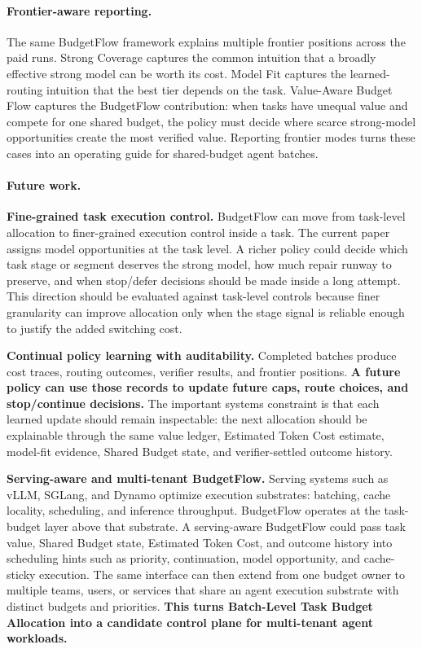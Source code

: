 \documentclass{article}
\newcommand{\method}{BudgetFlow\xspace}
\newcommand{\tokencost}{Estimated Token Cost\xspace}
\newcommand{\sharedbudget}{Shared Budget\xspace}
\begin{document}
\paragraph{Frontier-aware reporting.}
The same \method framework explains multiple frontier positions across the paid runs. Strong Coverage captures the common intuition that a broadly effective strong model can be worth its cost. Model Fit captures the learned-routing intuition that the best tier depends on the task. Value-Aware Budget Flow captures the \method contribution: when tasks have unequal value and compete for one shared budget, the policy must decide where scarce strong-model opportunities create the most verified value. Reporting frontier modes turns these cases into an operating guide for shared-budget agent batches.

\paragraph{Future work.}
\textbf{Fine-grained task execution control.} \method can move from task-level allocation to finer-grained execution control inside a task. The current paper assigns model opportunities at the task level. A richer policy could decide which task stage or segment deserves the strong model, how much repair runway to preserve, and when stop/defer decisions should be made inside a long attempt. This direction should be evaluated against task-level controls because finer granularity can improve allocation only when the stage signal is reliable enough to justify the added switching cost.

\textbf{Continual policy learning with auditability.} Completed batches produce cost traces, routing outcomes, verifier results, and frontier positions. \textbf{A future policy can use those records to update future caps, route choices, and stop/continue decisions.} The important systems constraint is that each learned update should remain inspectable: the next allocation should be explainable through the same value ledger, \tokencost estimate, model-fit evidence, \sharedbudget state, and verifier-settled outcome history.

\textbf{Serving-aware and multi-tenant BudgetFlow.} Serving systems such as vLLM, SGLang, and Dynamo optimize execution substrates: batching, cache locality, scheduling, and inference throughput. \method operates at the task-budget layer above that substrate. A serving-aware BudgetFlow could pass task value, \sharedbudget state, \tokencost, and outcome history into scheduling hints such as priority, continuation, model opportunity, and cache-sticky execution. The same interface can then extend from one budget owner to multiple teams, users, or services that share an agent execution substrate with distinct budgets and priorities. \textbf{This turns Batch-Level Task Budget Allocation into a candidate control plane for multi-tenant agent workloads.}
\end{document}
